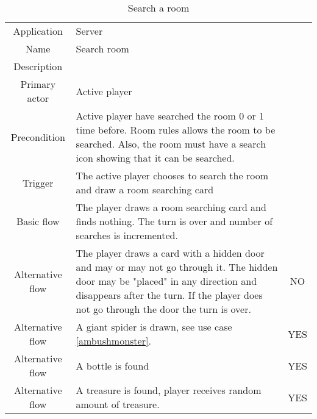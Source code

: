 \begin{table}
\caption{Search a room}
\label{searchroom}
\begin{tabular}{|c| p{9cm}|c}
\hline
Application & Server & \\
Name & Search room & \\
Description &  & \\
Primary actor & Active player & \\
Precondition & Active player have searched the room 0 or 1 time before. Room rules allows the room to be searched. Also, the room must have a search icon showing that it can be searched.  & \\
Trigger & The active player chooses to search the room and draw a room searching card  & \\ \hline
Basic flow & The player draws a room searching card and finds nothing. The turn is over and number of searches is incremented. & \\ \hline
Alternative flow & The player draws a card with a hidden door and may or may not go through it. The hidden door may be "placed" in any direction and disappears after the turn. If the player does not go through the door the turn is over. & NO \\\hline
Alternative flow & A giant spider is drawn, see use case \ref{ambushmonster}. & YES \\ \hline
Alternative flow & A bottle is found & YES \\ \hline
Alternative flow & A treasure is found, player receives random amount of treasure. & YES \\
\hline
\end{tabular}
\end{table}

